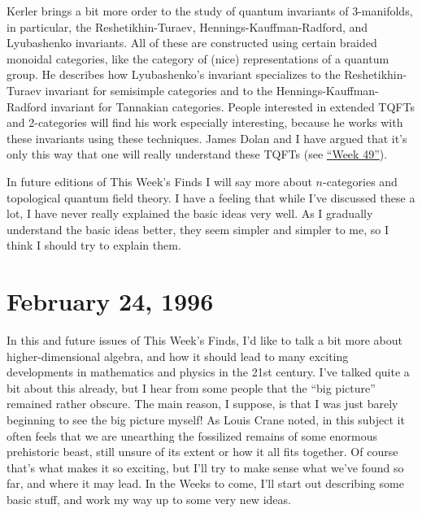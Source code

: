 \documentclass{article}
\def\tightlist{}
\renewcommand{\texttt}[1]{%
  \begingroup
  \ttfamily
  \begingroup\lccode`~=`/\lowercase{\endgroup\def~}{/\discretionary{}{}{}}%
  \begingroup\lccode`~=`[\lowercase{\endgroup\def~}{[\discretionary{}{}{}}%
  \begingroup\lccode`~=`.\lowercase{\endgroup\def~}{.\discretionary{}{}{}}%
  \catcode`/=\active\catcode`[=\active\catcode`.=\active
  \scantokens{#1\noexpand}%
  \endgroup
}
\begin{document}

Kerler brings a bit more order to the study of quantum invariants of
3-manifolds, in particular, the Reshetikhin-Turaev,
Hennings-Kauffman-Radford, and Lyubashenko invariants. All of these are
constructed using certain braided monoidal categories, like the category
of (nice) representations of a quantum group. He describes how
Lyubashenko's invariant specializes to the Reshetikhin-Turaev invariant
for semisimple categories and to the Hennings-Kauffman-Radford invariant
for Tannakian categories. People interested in extended TQFTs and
2-categories will find his work especially interesting, because he works
with these invariants using these techniques. James Dolan and I have
argued that it's only this way that one will really understand these
TQFTs (see \protect\hyperlink{week49}{``Week 49''}).

In future editions of This Week's Finds I will say more about
\(n\)-categories and topological quantum field theory. I have a feeling
that while I've discussed these a lot, I have never really explained the
basic ideas very well. As I gradually understand the basic ideas better,
they seem simpler and simpler to me, so I think I should try to explain
them.
\hypertarget{week73}{%
\section{February 24, 1996}\label{week73}}

In this and future issues of This Week's Finds, I'd like to talk a bit
more about higher-dimensional algebra, and how it should lead to many
exciting developments in mathematics and physics in the 21st century.
I've talked quite a bit about this already, but I hear from some people
that the ``big picture'' remained rather obscure. The main reason, I
suppose, is that I was just barely beginning to see the big picture
myself! As Louis Crane noted, in this subject it often feels that we are
unearthing the fossilized remains of some enormous prehistoric beast,
still unsure of its extent or how it all fits together. Of course that's
what makes it so exciting, but I'll try to make sense what we've found
so far, and where it may lead. In the Weeks to come, I'll start out
describing some basic stuff, and work my way up to some very new ideas.
\end{document}
